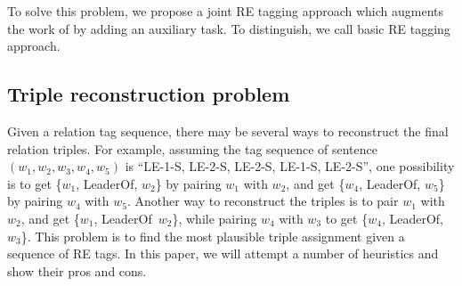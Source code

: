 To solve this problem, we propose a joint RE tagging approach which augments the
work of \cite{Zheng2017} by adding an auxiliary task. To distinguish, we
call \cite{Zheng2017} basic RE tagging approach.



\subsection{Triple reconstruction problem}
Given a relation tag sequence, there may be several ways to
reconstruct the final relation triples. For example, assuming the tag sequence
of sentence $(w_1, w_2, w_3, w_4, w_5)$ is ``LE-1-S, LE-2-S, LE-2-S, LE-1-S,
LE-2-S'', one possibility is to get \{$w_1$, LeaderOf, $w_2$\} by pairing
$w_1$ with $w_2$, and get \{$w_4$, LeaderOf, $w_5$\} by pairing $w_4$ with
$w_5$. Another way to reconstruct the triples is to pair $w_1$ with $w_2$, and
get \{$w_1$, LeaderOf\, $w_2$\}, while pairing $w_4$ with $w_3$ to get \{$w_4$,
LeaderOf, $w_3$\}. This problem is to find the most plausible triple assignment
given a sequence of RE tags. In this paper, we will attempt a number of
heuristics and show their pros and cons.

